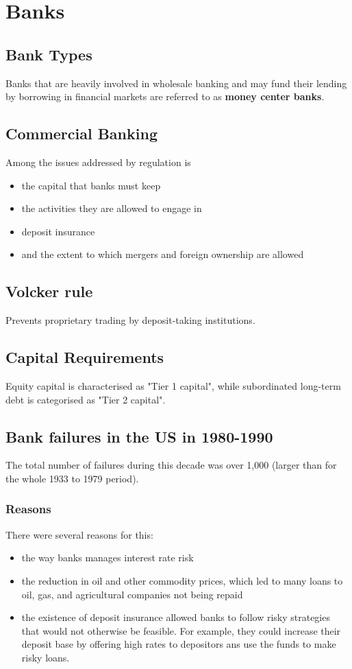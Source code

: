 \chapter{Banks}

\section{Bank Types}
Banks that are heavily involved in wholesale banking and may fund their lending by borrowing in financial markets are referred to as \textbf{\color{blue}money center banks}.

\section{Commercial Banking}
Among the issues addressed by regulation is
\begin{itemize}
	\item the capital that banks must keep
	\item the activities they are allowed to engage in
	\item deposit insurance
	\item and the extent to which mergers and foreign ownership are allowed
\end{itemize}

\section{Volcker rule}
Prevents proprietary trading by deposit-taking institutions.

\section{Capital Requirements}
Equity capital is characterised as "Tier 1 capital", while subordinated long-term debt is categorised as "Tier 2 capital".

\section{Bank failures in the US in 1980-1990}
The total number of failures during this decade was over 1,000 (larger than for the whole 1933 to 1979 period).

\subsection{Reasons}
There were several reasons for this:
\begin{itemize}
	\item the way banks manages interest rate risk
	\item the reduction in oil and other commodity prices, which led to many loans to oil, gas, and agricultural companies not being repaid
	\item the existence of deposit insurance allowed banks to follow risky strategies that would not otherwise be feasible. For example, they could increase their deposit base by offering high rates to depositors ans use the funds to make risky loans.
\end{itemize}

